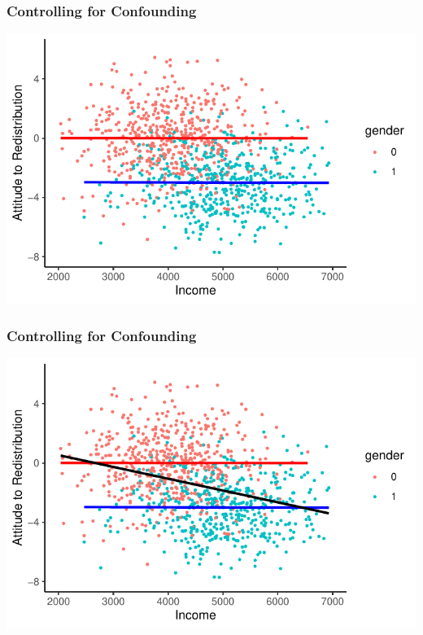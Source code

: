\documentclass[xcolor=x11names,compress]{beamer}\usepackage[]{graphicx}\usepackage[]{color}
\makeatletter
\def\maxwidth{ %
  \ifdim\Gin@nat@width>\linewidth
    \linewidth
  \else
    \Gin@nat@width
  \fi
}
\newenvironment{knitrout}{}{} %
\renewcommand{\(}{\begin{columns}}
\renewcommand{\)}{\end{columns}}
\newcommand{\<}[1]{\begin{column}{#1}}
\renewcommand{\>}{\end{column}}
\makeatother
\begin{document}
\begin{frame}
\frametitle{Controlling for Confounding}
\begin{knitrout}
\color{fgcolor}
\includegraphics[width=\maxwidth]{figure/confound1b-1} 

\end{knitrout}
\end{frame}

\begin{frame}
\frametitle{Controlling for Confounding}
\begin{knitrout}
\color{fgcolor}
\includegraphics[width=\maxwidth]{figure/confound2-1} 

\end{knitrout}
\end{frame}
\end{document}
